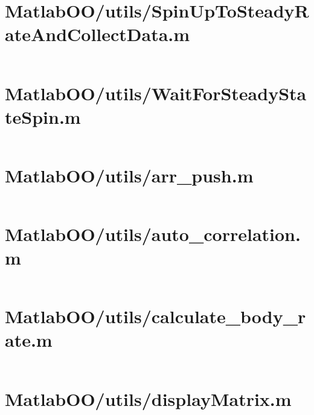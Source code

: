 \pagebreak
\section{MatlabOO/utils/SpinUpToSteadyRateAndCollectData.m}\label{code:MatlabOO/utils/SpinUpToSteadyRateAndCollectData.m}
\inputminted[linenos,fontsize=\scriptsize]{matlab}{/home/dcouture/git/mathyourlife/TSatPy/beta_versions/matlab_object_oriented/utils/SpinUpToSteadyRateAndCollectData.m}

\pagebreak
\section{MatlabOO/utils/WaitForSteadyStateSpin.m}\label{code:MatlabOO/utils/WaitForSteadyStateSpin.m}
\inputminted[linenos,fontsize=\scriptsize]{matlab}{/home/dcouture/git/mathyourlife/TSatPy/beta_versions/matlab_object_oriented/utils/WaitForSteadyStateSpin.m}

\pagebreak
\section{MatlabOO/utils/arr\_push.m}\label{code:MatlabOO/utils/arr_push.m}
\inputminted[linenos,fontsize=\scriptsize]{matlab}{/home/dcouture/git/mathyourlife/TSatPy/beta_versions/matlab_object_oriented/utils/arr_push.m}

\pagebreak
\section{MatlabOO/utils/auto\_correlation.m}\label{code:MatlabOO/utils/auto_correlation.m}
\inputminted[linenos,fontsize=\scriptsize]{matlab}{/home/dcouture/git/mathyourlife/TSatPy/beta_versions/matlab_object_oriented/utils/auto_correlation.m}

\pagebreak
\section{MatlabOO/utils/calculate\_body\_rate.m}\label{code:MatlabOO/utils/calculate_body_rate.m}
\inputminted[linenos,fontsize=\scriptsize]{matlab}{/home/dcouture/git/mathyourlife/TSatPy/beta_versions/matlab_object_oriented/utils/calculate_body_rate.m}

\pagebreak
\section{MatlabOO/utils/displayMatrix.m}\label{code:MatlabOO/utils/displayMatrix.m}
\inputminted[linenos,fontsize=\scriptsize]{matlab}{/home/dcouture/git/mathyourlife/TSatPy/beta_versions/matlab_object_oriented/utils/displayMatrix.m}

